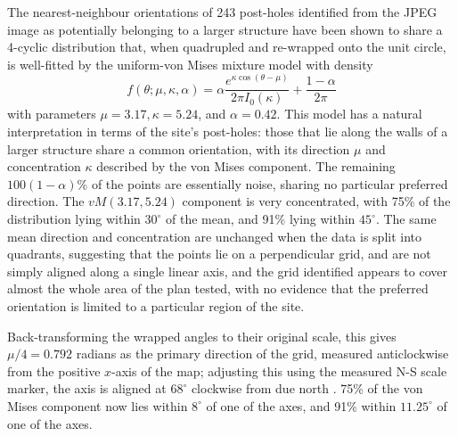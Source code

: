 \documentclass[../../ArchStats.tex]{subfiles}
\begin{document}
The nearest-neighbour orientations of 243 post-holes identified from the JPEG image as potentially belonging to a larger structure have been shown to share a 4-cyclic distribution that, when quadrupled and re-wrapped onto the unit circle, is well-fitted by the uniform-von Mises mixture model with density
\begin{equation}
f(\theta; \mu, \kappa, \alpha) = \alpha \frac{e^{\kappa \cos(\theta - \mu)}}{2\pi I_0(\kappa)} + \frac{1-\alpha}{2\pi}
\end{equation}
with parameters $\mu = 3.17, \kappa = 5.24$, and $\alpha =  0.42$. This model has a natural interpretation in terms of the site's post-holes: those that lie along the walls of a larger structure share a common orientation, with its direction $\mu$ and concentration $\kappa$ described by the von Mises component. The remaining $100(1-\alpha)\%$ of the points are essentially noise, sharing no particular preferred direction. The $vM(3.17, 5.24)$ component is very concentrated, with 75\% of the distribution lying within $30^\circ$ of the mean, and 91\% lying within $45^\circ$. The same mean direction and  concentration are unchanged when the data is split into quadrants, suggesting that the points lie on a perpendicular grid, and are not simply aligned along a single linear axis, and the grid identified appears to cover almost the whole area of the plan tested, with no evidence that the preferred orientation is limited to a particular region of the site.

Back-transforming the wrapped angles to their original scale, this gives $\mu/4 = 0.792$ radians as the primary direction of the grid, measured anticlockwise from the positive $x$-axis of the map; adjusting this using the measured N-S scale marker, the axis is aligned at $68^\circ$ clockwise from due north . 75\% of the von Mises component now lies within $8^\circ$ of one of the axes, and 91\% within $11.25^\circ$ of one of the axes.


\end{document}
